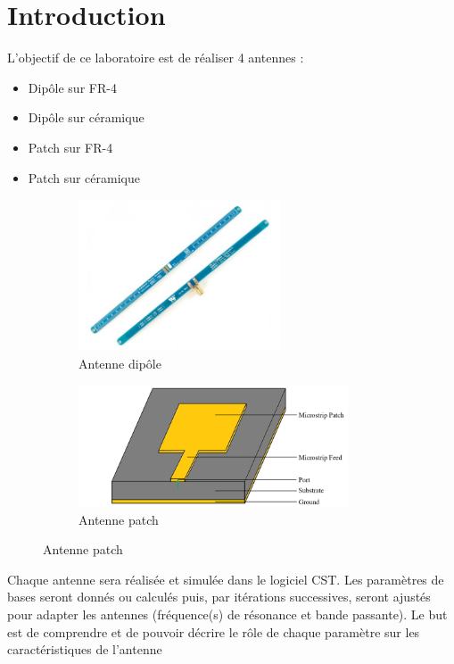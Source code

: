 \documentclass[Deriaz_Traiber_Labo02.tex]{subfiles}
\begin{document}
\chapter{Introduction}
L'objectif de ce laboratoire est de réaliser 4 antennes :
\begin{itemize}
\item Dipôle sur FR-4
\item Dipôle sur céramique
\item Patch sur FR-4
\item Patch sur céramique
\end{itemize}
\begin{figure}[H]
\centering
\begin{subfigure}{0.5\textwidth}
\centering
\includegraphics[width=6cm]{Figure/antenne_dipole.jpg}
\caption[caption]{Antenne dipôle\footnotemark}
\end{subfigure}
\begin{subfigure}{0.5\textwidth}
\centering
\includegraphics[width=8cm]{Figure/antenne_patch.png}
\caption[caption]{Antenne patch\footnotemark}
\end{subfigure}
\end{figure}


Chaque antenne sera réalisée et simulée dans le logiciel CST. Les paramètres de bases seront donnés ou calculés puis, par itérations successives, seront ajustés pour adapter les antennes (fréquence(s) de résonance et bande passante). Le but est de comprendre et de pouvoir décrire le rôle de chaque paramètre sur les caractéristiques de l'antenne
\end{document}
